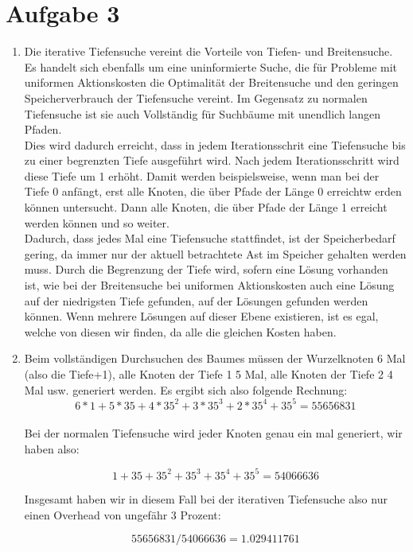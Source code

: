 \documentclass[a4paper,10pt]{article}
\begin{document}
\section*{Aufgabe 3}
\begin{enumerate}[~~a)]
	\item
	Die iterative Tiefensuche vereint die Vorteile von Tiefen- und Breitensuche. Es handelt sich ebenfalls um eine uninformierte Suche, die für Probleme mit uniformen Aktionskosten die Optimalität der Breitensuche und den geringen Speicherverbrauch der Tiefensuche vereint. Im Gegensatz zu normalen Tiefensuche ist sie auch Vollständig für Suchbäume mit unendlich langen Pfaden. \\
Dies wird dadurch erreicht, dass in jedem Iterationsschrit eine Tiefensuche bis zu einer begrenzten Tiefe ausgeführt wird. Nach jedem Iterationsschritt wird diese Tiefe um 1 erhöht. Damit werden beispielsweise, wenn man bei der Tiefe 0 anfängt, erst alle Knoten, die über Pfade der Länge 0 erreichtw erden können untersucht. Dann alle Knoten, die über Pfade der Länge 1 erreicht werden können und so weiter. \\
Dadurch, dass jedes Mal eine Tiefensuche stattfindet, ist der Speicherbedarf gering, da immer nur der aktuell betrachtete Ast im Speicher gehalten werden muss. Durch die Begrenzung der Tiefe wird, sofern eine Lösung vorhanden ist, wie bei der Breitensuche bei uniformen Aktionskosten auch eine Lösung auf der niedrigsten Tiefe gefunden, auf der Lösungen gefunden werden können. Wenn mehrere Lösungen auf dieser Ebene existieren, ist es egal, welche von diesen wir finden, da alle die gleichen Kosten haben. \\

	\item
	Beim vollständigen Durchsuchen des Baumes müssen der Wurzelknoten 6 Mal (also die Tiefe+1), alle Knoten der Tiefe 1 5 Mal, alle Knoten der Tiefe 2 4 Mal usw. generiert werden. Es ergibt sich also folgende Rechnung:
	$$ 6*1 + 5*35 + 4*35^2 + 3*35^3 + 2*35^4 + 35^5 = 55 656 831 $$\\
	
	Bei der normalen Tiefensuche wird jeder Knoten genau ein mal generiert, wir haben also:
	
	$$ 1 + 35 + 35^2 + 35^3 + 35^4 + 35^5 = 54 066 636$$
	
	Insgesamt haben wir in diesem Fall bei der iterativen Tiefensuche also nur einen Overhead von ungefähr 3 Prozent:
	
	$$55656831/54066636 = 1.029411761$$


\end{enumerate}
\end{document}
